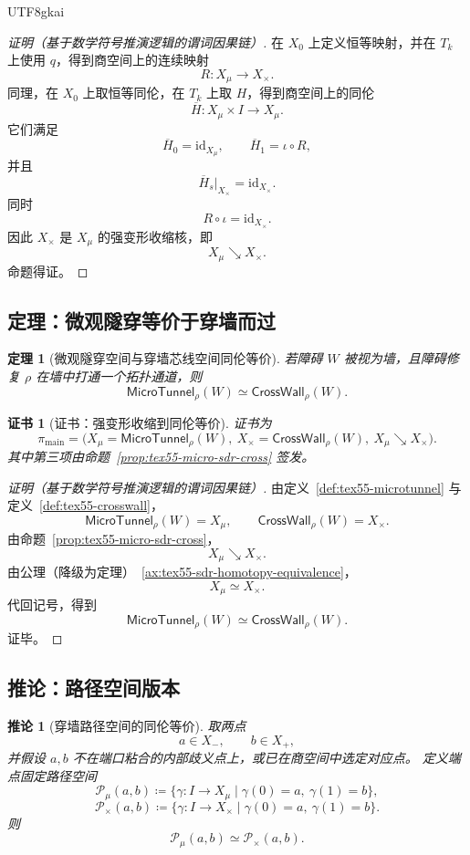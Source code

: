 \documentclass[12pt]{article}
\newtheorem{theorem}{定理}[section]
\newtheorem{corollary}{推论}[section]
\newtheorem{Certificate}{证书}[section]
\newcommand{\MicroTunnel}{\mathsf{MicroTunnel}}
\newcommand{\CrossWall}{\mathsf{CrossWall}}
\newcommand{\Path}{\mathcal P}
\newcommand{\DefEq}{\coloneqq}
\newcommand{\id}{\mathrm{id}}
\newcommand{\incl}{\iota}
\begin{document}
\begin{CJK*}{UTF8}{gkai}
\begin{proof}[证明（基于数学符号推演逻辑的谓词因果链）]
在 \(X_0\) 上定义恒等映射，并在 \(T_k\) 上使用 \(q\)，得到商空间上的连续映射
\[
  R:X_{\mu}\to X_{\times}.
\]
同理，在 \(X_0\) 上取恒等同伦，在 \(T_k\) 上取 \(H\)，得到商空间上的同伦
\[
  \overline H:X_{\mu}\times I\to X_{\mu}.
\]
它们满足
\[
  \overline H_0=\id_{X_{\mu}},
  \qquad
  \overline H_1=\incl\circ R,
\]
并且
\[
  \overline H_s|_{X_{\times}}=\id_{X_{\times}}.
\]
同时
\[
  R\circ\incl=\id_{X_{\times}}.
\]
因此 \(X_{\times}\) 是 \(X_{\mu}\) 的强变形收缩核，即
\[
  X_{\mu}\searrow X_{\times}.
\]
命题得证。
\end{proof}

\subsection{定理：微观隧穿等价于穿墙而过}
\label{subsec:tex55-main-theorem}

\begin{theorem}[微观隧穿空间与穿墙芯线空间同伦等价]
\label{thm:tex55-micro-cross-homotopy-equivalence}
若障碍 \(W\) 被视为墙，且障碍修复 \(\rho\) 在墙中打通一个拓扑通道，则
\[
  \MicroTunnel_{\rho}(W)
  \simeq
  \CrossWall_{\rho}(W).
\]
\end{theorem}

\begin{Certificate}[证书：强变形收缩到同伦等价]
\label{cert:tex55-main-theorem}
证书为
\[
  \pi_{\mathrm{main}}
  =
  \bigl(
    X_{\mu}=\MicroTunnel_{\rho}(W),\
    X_{\times}=\CrossWall_{\rho}(W),\
    X_{\mu}\searrow X_{\times}
  \bigr).
\]
其中第三项由命题~\ref{prop:tex55-micro-sdr-cross} 签发。
\end{Certificate}

\begin{proof}[证明（基于数学符号推演逻辑的谓词因果链）]
由定义~\ref{def:tex55-microtunnel} 与定义~\ref{def:tex55-crosswall}，
\[
  \MicroTunnel_{\rho}(W)=X_{\mu},
  \qquad
  \CrossWall_{\rho}(W)=X_{\times}.
\]
由命题~\ref{prop:tex55-micro-sdr-cross}，
\[
  X_{\mu}\searrow X_{\times}.
\]
由公理（降级为定理）~\ref{ax:tex55-sdr-homotopy-equivalence}，
\[
  X_{\mu}\simeq X_{\times}.
\]
代回记号，得到
\[
  \MicroTunnel_{\rho}(W)
  \simeq
  \CrossWall_{\rho}(W).
\]
证毕。
\end{proof}

\subsection{推论：路径空间版本}
\label{subsec:tex55-path-space-corollary}

\begin{corollary}[穿墙路径空间的同伦等价]
\label{cor:tex55-path-space}
取两点
\[
  a\in X_-,
  \qquad
  b\in X_+,
\]
并假设 \(a,b\) 不在端口粘合的内部歧义点上，或已在商空间中选定对应点。
定义端点固定路径空间
\[
  \Path_{\mu}(a,b)
  \DefEq
  \{\gamma:I\to X_{\mu}\mid \gamma(0)=a,\ \gamma(1)=b\},
\]
\[
  \Path_{\times}(a,b)
  \DefEq
  \{\gamma:I\to X_{\times}\mid \gamma(0)=a,\ \gamma(1)=b\}.
\]
则
\[
  \Path_{\mu}(a,b)\simeq \Path_{\times}(a,b).
\]
\end{corollary}


\end{CJK*}
\end{document}
